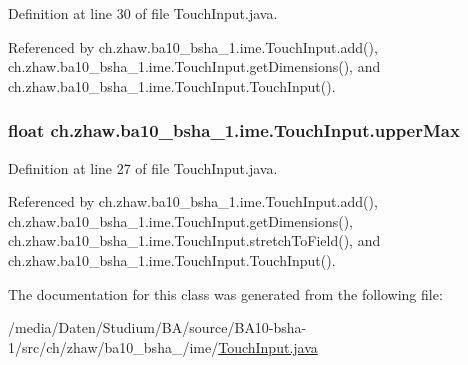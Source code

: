 Definition at line 30 of file TouchInput.java.

Referenced by ch.zhaw.ba10\_\-bsha\_\-1.ime.TouchInput.add(), ch.zhaw.ba10\_\-bsha\_\-1.ime.TouchInput.getDimensions(), and ch.zhaw.ba10\_\-bsha\_\-1.ime.TouchInput.TouchInput().\hypertarget{classch_1_1zhaw_1_1ba10__bsha__1_1_1ime_1_1TouchInput_a30f650d3ad8ed1df80b13bf4b6a90ccd}{
\subsubsection[{upperMax}]{\setlength{\rightskip}{0pt plus 5cm}float {\bf ch.zhaw.ba10\_\-bsha\_\-1.ime.TouchInput.upperMax}}}
\label{classch_1_1zhaw_1_1ba10__bsha__1_1_1ime_1_1TouchInput_a30f650d3ad8ed1df80b13bf4b6a90ccd}


Definition at line 27 of file TouchInput.java.

Referenced by ch.zhaw.ba10\_\-bsha\_\-1.ime.TouchInput.add(), ch.zhaw.ba10\_\-bsha\_\-1.ime.TouchInput.getDimensions(), ch.zhaw.ba10\_\-bsha\_\-1.ime.TouchInput.stretchToField(), and ch.zhaw.ba10\_\-bsha\_\-1.ime.TouchInput.TouchInput().

The documentation for this class was generated from the following file:\begin{DoxyCompactItemize}
\item 
/media/Daten/Studium/BA/source/BA10-\/bsha-\/1/src/ch/zhaw/ba10\_\-bsha\_/ime/\hyperlink{TouchInput_8java}{TouchInput.java}\end{DoxyCompactItemize}
